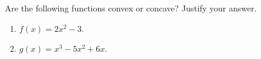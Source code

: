 
Are the following functions convex or concave? Justify your answer.
\begin{enumerate}
	\item $f(x) = 2x^2 - 3$.
	\item $g(x) = x^3 - 5x^2 + 6x$. 
\end{enumerate}
